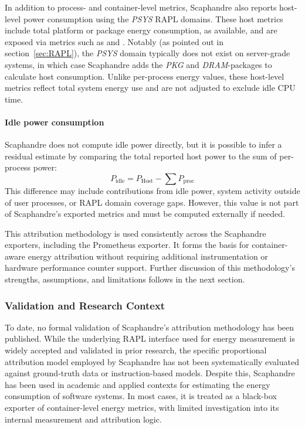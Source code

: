 In addition to process- and container-level metrics, Scaphandre also reports host-level power consumption using the \textit{PSYS} RAPL domains. These host metrics include total platform or package energy consumption, as available, and are exposed via metrics such as  and . Notably (as pointed out in section~\ref{sec:RAPL}), the \textit{PSYS} domain typically does not exist on server-grade systems, in which case Scaphandre adds the \textit{PKG} and \textit{DRAM}-packages to calculate host consumption. Unlike per-process energy values, these host-level metrics reflect total system energy use and are not adjusted to exclude idle CPU time.

\paragraph{Idle power consumption}
Scaphandre does not compute idle power directly, but it is possible to infer a residual estimate by comparing the total reported host power to the sum of per-process power:
\[
P_{\text{idle}} = P_{\text{Host}} - \sum P_{\text{proc}}
\]
This difference may include contributions from idle power, system activity outside of user processes, or RAPL domain coverage gaps. However, this value is not part of Scaphandre’s exported metrics and must be computed externally if needed.

This attribution methodology is used consistently across the Scaphandre exporters, including the Prometheus exporter. It forms the basis for container-aware energy attribution without requiring additional instrumentation or hardware performance counter support. Further discussion of this methodology’s strengths, assumptions, and limitations follows in the next section.

\subsubsection{Validation and Research Context}
\label{sec:scaphandre-validation}

To date, no formal validation of Scaphandre’s attribution methodology has been published. While the underlying RAPL interface used for energy measurement is widely accepted and validated in prior research, the specific proportional attribution model employed by Scaphandre has not been systematically evaluated against ground-truth data or instruction-based models. Despite this, Scaphandre has been used in academic and applied contexts for estimating the energy consumption of software systems. In most cases, it is treated as a black-box exporter of container-level energy metrics, with limited investigation into its internal measurement and attribution logic.


